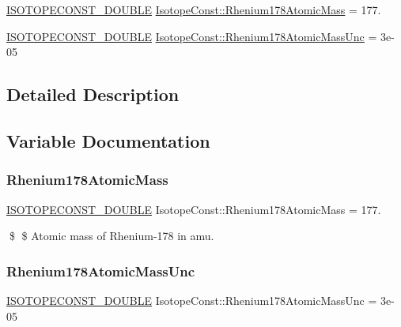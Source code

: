 \begin{DoxyCompactItemize}
\item 
\mbox{\hyperlink{group___isotope_const-_macros_ga8f45a7272ce02c0b4c65c44636ed719a}{I\+S\+O\+T\+O\+P\+E\+C\+O\+N\+S\+T\+\_\+\+D\+O\+U\+B\+LE}} \mbox{\hyperlink{group___isotope_const-_rhenium-_re178_ga29d174e11782e5556b6a823af11a6b49}{Isotope\+Const\+::\+Rhenium178\+Atomic\+Mass}} = 177.
\item 
\mbox{\hyperlink{group___isotope_const-_macros_ga8f45a7272ce02c0b4c65c44636ed719a}{I\+S\+O\+T\+O\+P\+E\+C\+O\+N\+S\+T\+\_\+\+D\+O\+U\+B\+LE}} \mbox{\hyperlink{group___isotope_const-_rhenium-_re178_ga1ec2063141b5e2d826c7730648f37485}{Isotope\+Const\+::\+Rhenium178\+Atomic\+Mass\+Unc}} = 3e-\/05
\end{DoxyCompactItemize}


\subsection{Detailed Description}


\subsection{Variable Documentation}
\mbox{\label{group___isotope_const-_rhenium-_re178_ga29d174e11782e5556b6a823af11a6b49}} 
\subsubsection{\texorpdfstring{Rhenium178\+Atomic\+Mass}{Rhenium178AtomicMass}}
{\footnotesize\ttfamily \mbox{\hyperlink{group___isotope_const-_macros_ga8f45a7272ce02c0b4c65c44636ed719a}{I\+S\+O\+T\+O\+P\+E\+C\+O\+N\+S\+T\+\_\+\+D\+O\+U\+B\+LE}} Isotope\+Const\+::\+Rhenium178\+Atomic\+Mass = 177.}

\$ \$ Atomic mass of Rhenium-\/178 in amu. \mbox{\label{group___isotope_const-_rhenium-_re178_ga1ec2063141b5e2d826c7730648f37485}} 
\subsubsection{\texorpdfstring{Rhenium178\+Atomic\+Mass\+Unc}{Rhenium178AtomicMassUnc}}
{\footnotesize\ttfamily \mbox{\hyperlink{group___isotope_const-_macros_ga8f45a7272ce02c0b4c65c44636ed719a}{I\+S\+O\+T\+O\+P\+E\+C\+O\+N\+S\+T\+\_\+\+D\+O\+U\+B\+LE}} Isotope\+Const\+::\+Rhenium178\+Atomic\+Mass\+Unc = 3e-\/05}

